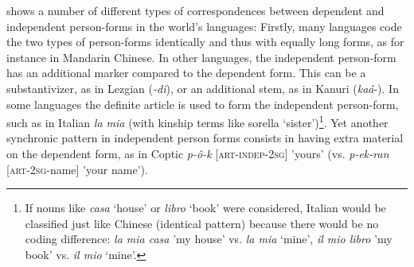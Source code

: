 \documentclass[output=paper]{langsci/langscibook}
\begin{document}
 shows a number of different types of correspondences between dependent and independent person-forms in the world's languages: Firstly, many languages code the two types of person-forms identically and thus with equally long forms, as for instance in Mandarin Chinese. In other languages, the independent person-form has an additional marker compared to the dependent form. This can be a substantivizer, as in Lezgian (\textit{{}-di}), or an additional stem, as in Kanuri (\textit{kaá}{}-). In some languages the definite article is used to form the independent person-form, such as in Italian \textit{la mia} (with kinship terms like sorella ‘sister’)\footnote{If nouns like \textit{casa} `house' or \textit{libro} `book' were considered, Italian would be classified just like Chinese (identical pattern) because there would be no coding difference: \textit{la mia casa} 'my house' vs. \textit{la mia} `mine', \textit{il mio libro} 'my book' vs. \textit{il mio} `mine'.}. Yet another synchronic pattern in independent person forms consists in having extra material on the dependent form, as in Coptic \textit{p-ô-k} [\textsc{art-indep-2sg}] 'yours' (vs. \textit{p-ek-ran} [\textsc{art-2sg}{}-name] 'your name').
\end{document}
